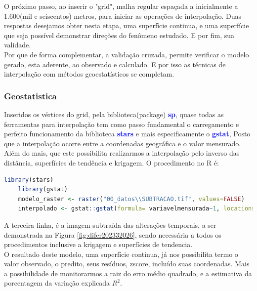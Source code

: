\hspace*{1.25 cm}  O próximo passo, ao inserir o "grid", malha regular espaçada a inicialmente a 1.600(mil e seiscentos) metros, para iniciar as operações de interpolação. Duas respostas desejamos obter nesta etapa,  uma superfície continua, e uma superfície que seja possível demonstrar direções do fenômeno estudado. E por fim, sua validade. \\
% 
\hspace*{1.25 cm} Por que de  forma complementar, a validação cruzada, permite  verificar o modelo gerado, esta aderente, ao observado e calculado. E por isso as técnicas de interpolação com métodos geoestatísticos se completam. 
\subsubsection{Geostatistica}
 \hspace*{1.25 cm} Inseridos os vértices do grid, pela biblioteca(package) \textbf{\textcolor{blue}{sp}}, quase todas as ferramentas para interpolação tem como passo fundamental o carregamento e perfeito funcionamento da biblioteca \textbf{\textcolor{blue}{stars}} e mais especificamente o \textbf{\textcolor{blue}{gstat}}, Posto que a interpolação ocorre entre a coordenadas geográfica e o valor mensurado. Além do mais, que este possibilita realizarmos a interpolação pelo inverso das distância, superfícies de tendência e krigagem.  O procedimento no R é: 
 \lstset{
	language=R, %
	caption= Interpolação em linguagem R,} %
\begin{lstlisting}[language=R]
	library(stars)
	library(gstat)
	modelo_raster <- raster("00_datos\\SUBTRACAO.tif", values=FALSE)
	interpolado <- gstat::gstat(formula= variavelmensurada~1, locations = arquivodogrid, set = parametrosdomodelo )	   
\end{lstlisting}  
\hspace*{1.25 cm}  A terceira linha, é a imagem subtraída das alterações temporais, a ser demonstrada na Figura \ref{fig:difer202332026}, sendo necessária a todos os procedimentos inclusive a krigagem e superfícies de tendencia.\\
\hspace*{1.25 cm}  O resultado deste modelo, uma superfície continua, já nos possibilita termo o valor observado, o predito, seus resíduos, zscore, incluído suas coordenadas. Mais a possibilidade de monitorarmos a raiz do erro médio quadrado, e a estimativa da porcentagem da variação explicada $ R^{2}$.\\
